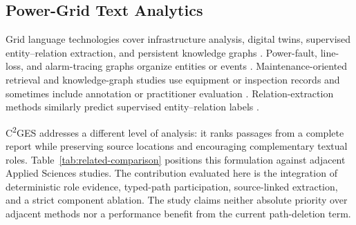 \documentclass[applsci,article,submit,moreauthors]{Definitions/mdpi}
\newcommand{\cges}{C\textsuperscript{2}GES}
\begin{document}
\subsection{Power-Grid Text Analytics}

Grid language technologies cover infrastructure analysis, digital twins, supervised entity--relation extraction, and persistent knowledge graphs \cite{xie2022massively,hamann2024foundation,madabhushi2023survey,srinivasan2023artificial,ranawaka2024leveraging,meng2023gridfield}. Power-fault, line-loss, and alarm-tracing graphs organize entities or events \cite{liu2022powerfault,li2024lineloss,ma2025alarm}. Maintenance-oriented retrieval and knowledge-graph studies use equipment or inspection records and sometimes include annotation or practitioner evaluation \cite{cao2024coalmaintenance,zgg2026bridge,dimaggio2025predictivemaintenance}. Relation-extraction methods similarly predict supervised entity--relation labels \cite{li2025moere,she2025clear}.

\cges{} addresses a different level of analysis: it ranks passages from a complete report while preserving source locations and encouraging complementary textual roles. Table~\ref{tab:related-comparison} positions this formulation against adjacent Applied Sciences studies. The contribution evaluated here is the integration of deterministic role evidence, typed-path participation, source-linked extraction, and a strict component ablation. The study claims neither absolute priority over adjacent methods nor a performance benefit from the current path-deletion term.
\end{document}
